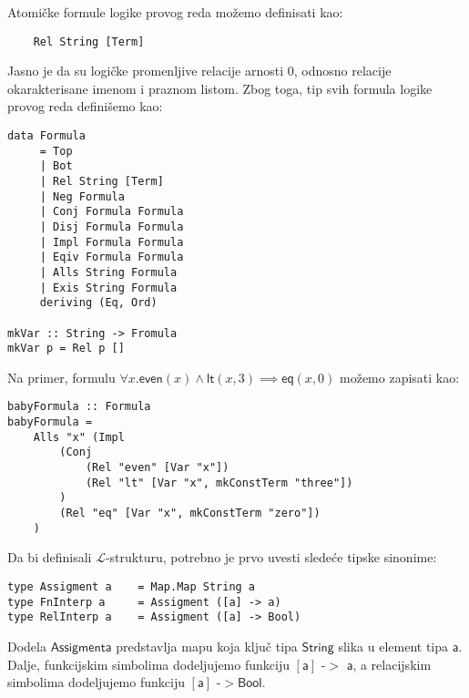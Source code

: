 \documentclass[a4paper,10pt]{article}
\theoremstyle{definition}
\begin{document}
Atomičke formule logike provog reda možemo definisati kao:
\begin{lstlisting}
    Rel String [Term]
\end{lstlisting}
Jasno je da su logičke promenljive relacije arnosti $0$, odnosno relacije okarakterisane imenom i praznom listom. Zbog toga, tip svih formula logike provog reda definišemo kao:
\begin{lstlisting}
data Formula
     = Top
     | Bot
     | Rel String [Term]
     | Neg Formula
     | Conj Formula Formula
     | Disj Formula Formula
     | Impl Formula Formula
     | Eqiv Formula Formula
     | Alls String Formula
     | Exis String Formula
     deriving (Eq, Ord)

mkVar :: String -> Fromula
mkVar p = Rel p []
\end{lstlisting}
Na primer, formulu $\forall x. \mathsf{even}(x) \land \mathsf{lt}(x, 3) \implies \mathsf{eq}(x, 0)$ možemo zapisati kao:
\begin{lstlisting}
babyFormula :: Formula
babyFormula =
    Alls "x" (Impl
        (Conj
            (Rel "even" [Var "x"])
            (Rel "lt" [Var "x", mkConstTerm "three"])
        )
        (Rel "eq" [Var "x", mkConstTerm "zero"])
    )
\end{lstlisting}

Da bi definisali $\mathcal{L}$-strukturu, potrebno je prvo uvesti sledeće tipske sinonime:
\begin{lstlisting}
type Assigment a    = Map.Map String a
type FnInterp a     = Assigment ([a] -> a)
type RelInterp a    = Assigment ([a] -> Bool)
\end{lstlisting}
Dodela $\mathsf{Assigment a}$ predstavlja mapu koja ključ tipa $\mathsf{String}$ slika u element tipa $\mathsf{a}$. Dalje, funkcijskim simbolima dodeljujemo funkciju $\mathsf{[a]}$ -$>$ $\mathsf{a}$, a relacijskim simbolima dodeljujemo funkciju $\mathsf{[a]}$ -$> \mathsf{Bool}$.
\end{document}
